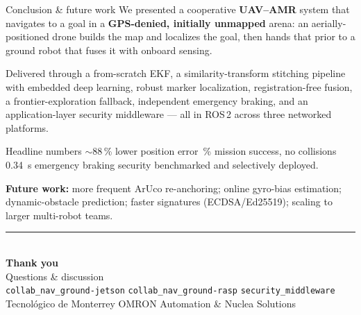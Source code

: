 \documentclass[aspectratio=169,11pt]{beamer}
\begin{document}
\begin{frame}{Conclusion \& future work}
\small
We presented a cooperative \textbf{UAV--AMR} system that navigates to a goal in a
\textbf{GPS-denied, initially unmapped} arena: an aerially-positioned drone builds
the map and localizes the goal, then hands that prior to a ground robot that fuses
it with onboard sensing.
\vspace{0.4em}

Delivered through a from-scratch EKF, a similarity-transform stitching pipeline
with embedded deep learning, robust marker localization, registration-free fusion,
a frontier-exploration fallback, independent emergency braking, and an
application-layer security middleware --- all in ROS\,2 across three networked platforms.

\begin{block}{Headline numbers}
$\sim$88\,\% lower position error \;\textbar{}\,\% mission success, no collisions
\;\textbar\; \SI{0.34}{\second} emergency braking \;\textbar\; security benchmarked
and selectively deployed.
\end{block}

\footnotesize \textbf{Future work:} more frequent ArUco re-anchoring; online
gyro-bias estimation; dynamic-obstacle prediction; faster signatures
(ECDSA/Ed25519); scaling to larger multi-robot teams.
\end{frame}

{%
\begin{frame}[plain]
\centering
\vfill
{\color{mAccent}\rule{0.14\paperwidth}{2pt}}\\[1.0em]
{\color{white}\bfseries Thank you}\\[0.6em]
{\large\color{white!80} Questions \& discussion}\\[1.4em]
{\color{white!55}\scriptsize
\texttt{collab\_nav\_ground-jetson} \;\textperiodcentered\;
\texttt{collab\_nav\_ground-rasp} \;\textperiodcentered\;
\texttt{security\_middleware}}\\[0.3em]
{\color{white!45}\scriptsize Tecnol\'ogico de Monterrey \;\textperiodcentered\;
OMRON Automation \;\&\; Nuclea Solutions}
\vfill
\end{frame}
}
\end{document}
